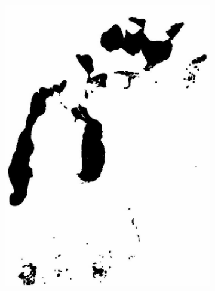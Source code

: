 \documentclass[12pt,a4paper]{article}
\begin{document}
\begin{figure}
\begin{subfigure}[b]{0.19\textwidth}
         \includegraphics[width=\textwidth]{../img/2013w.jpg}
         \caption{}
         \label{fig:}
     \end{subfigure}
     \begin{subfigure}[b]{0.19\textwidth}
         \centering

\end{subfigure}
\end{figure}
\end{document}

